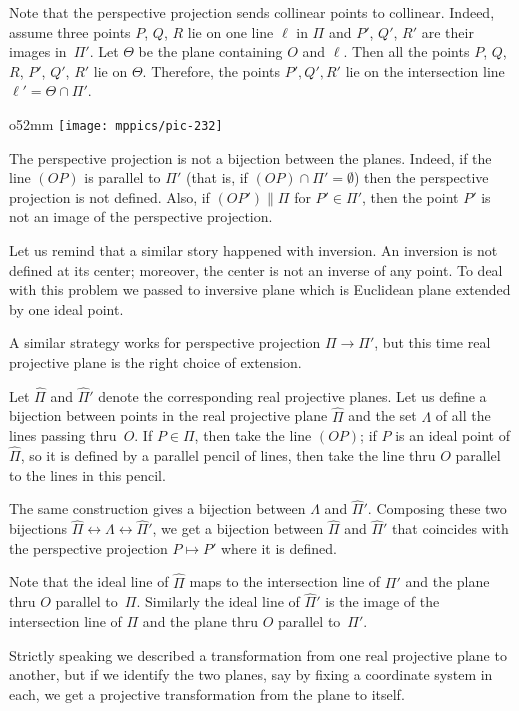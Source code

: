 Note that the perspective projection sends collinear points to collinear.
Indeed, assume three points $P$, $Q$, $R$ lie on one line $\ell$ in $\Pi$
and $P'$, $Q'$, $R'$ are their images in~$\Pi'$.
Let $\Theta$ be the plane containing $O$ and $\ell$.
Then all the points $P$, $Q$, $R$, $P'$, $Q'$, $R'$ lie on $\Theta$.
Therefore, the points $P',Q',R'$ lie on the  intersection line $\ell'=\Theta\cap \Pi'$.

\begin{wrapfigure}{o}{52mm}
\centering
\texttt{[image: mppics/pic-232]}
\end{wrapfigure}

The perspective projection is not a bijection between the planes.
Indeed, if the line $(OP)$ is parallel to $\Pi'$ 
(that is, if $(OP)\cap\Pi'=\emptyset$)
then the perspective projection is not defined.
Also, if $(OP')\parallel \Pi$ 
for $P'\in \Pi'$,
then the point $P'$ is not an image of the perspective projection.

Let us remind that a similar story happened with inversion.
An inversion is not defined at its center;
moreover, the center is not an inverse of any point.
To deal with this problem we passed to inversive plane 
which is Euclidean plane extended by one ideal point.

A similar strategy works for perspective projection $\Pi\to\Pi'$, but this time real projective plane is the right choice of extension.

Let $\hat \Pi$ and $\hat \Pi'$ denote the corresponding real projective planes.
Let us define a bijection between points in the real projective plane $\hat \Pi$ and the set $\Lambda$ of all the lines passing thru~$O$.
If $P\in \Pi$, then take the line $(OP)$;
if $P$ is an ideal point of $\hat \Pi$, so it is defined by a parallel pencil of lines, then take the line thru $O$ parallel to the lines in this pencil. 

The same construction gives a bijection between $\Lambda$ and $\hat \Pi'$.
Composing these two bijections $\hat \Pi\leftrightarrow \Lambda\leftrightarrow \hat \Pi'$, we get a bijection between $\hat \Pi$ and $\hat \Pi'$ that coincides with the perspective projection $P\mapsto P'$
where it is defined.

Note that the ideal line of $\hat\Pi$ maps to the intersection line of $\Pi'$ and the plane thru $O$ parallel to~$\Pi$.
Similarly the ideal line of $\hat\Pi'$
is the image of the intersection line of $\Pi$ and the plane thru $O$ parallel to~$\Pi'$.

Strictly speaking we described a transformation from one real projective plane to another, 
but if we identify the two planes, say by fixing a coordinate system in each, 
we get a projective transformation from the plane to itself. 

